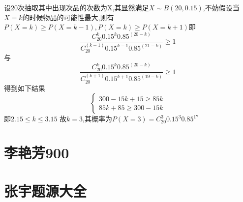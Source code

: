 \documentclass[12pt, a4paper, oneside, UTF8]{ctexbook}
\begin{document}
\begin{enumerate}
    \begin{solution}
        设20次抽取其中出现次品的次数为X,其显然满足$X\sim B(20,0.15)$,不妨假设当$X=k$的时候物品的可能性最大,则有
        $P(X=k)\geq P(X=k-1),P(X=k)\geq P(X=k+1)$即
        \[
        \frac{C_{20}^{k}0.15^{k}0.85^{(20-k)}}{C_{20}^{(k-1)}0.15^{k-1}0.85^{(21-k)}} \geq 1
        \]
        与
        \[
        \frac{C_{20}^{k}0.15^{k}0.85^{(20-k)}}{C_{20}^{(k+1)}0.15^{k+1}0.85^{(19-k)}} \geq 1
        \]
        得到如下结果
        \[
        \begin{cases}
            300-15k+15\geq 85k \\
            85k+85\geq 300-15k
        \end{cases}
        \]
        即$2.15\leq k \leq 3.15$ 故$k=3$,其概率为$P(X=3)=C_{20}^{3}0.15^{3}0.85^{17}$
    \end{solution}
\end{enumerate} 
\section{李艳芳900}

\section{张宇题源大全}

\ifx\allfiles\undefined
\end{document}
